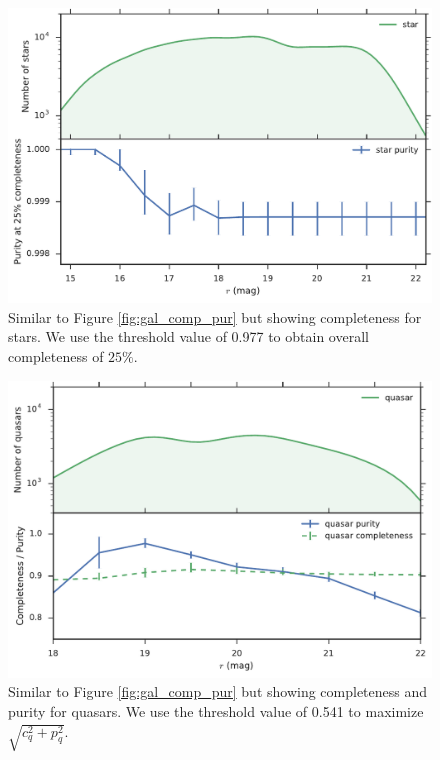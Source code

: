 \documentclass[fleqn,usenatbib]{mnras}
\begin{document}
\begin{figure}
  \centering
  \includegraphics[width=\columnwidth]{figures/star_comp_pur.pdf}
  \caption{
    Similar to Figure \ref{fig:gal_comp_pur} but showing completeness for stars.
    We use the threshold value of 0.977 to obtain overall completeness of $25\%$.
    }
  \label{fig:star_comp_pur}
\end{figure}

\begin{figure}
  \centering
  \includegraphics[width=\columnwidth]{figures/qso_comp_pur.pdf}
  \caption{
    Similar to Figure \ref{fig:gal_comp_pur} but showing completeness and purity for quasars.
    We use the threshold value of 0.541 to maximize $\sqrt{ c_q^2 + p_q^2 }$.
    }
  \label{fig:qso_comp_pur}
\end{figure}
\end{document}
